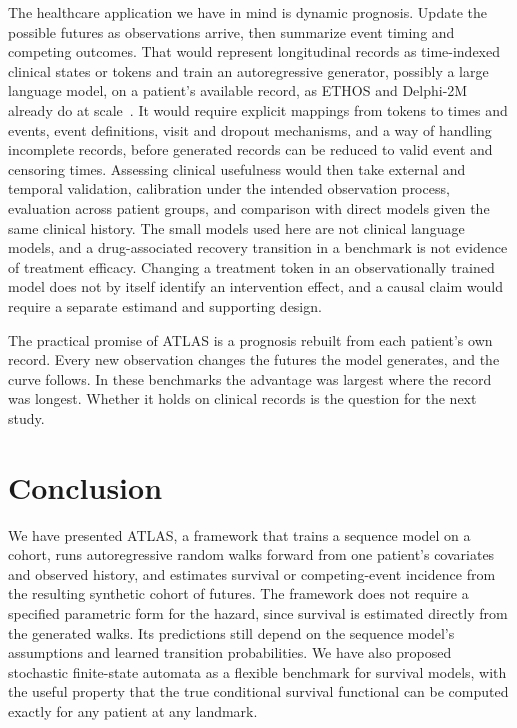The healthcare application we have in mind is dynamic prognosis. Update the possible futures as observations arrive, then summarize event timing and competing outcomes. That would represent longitudinal records as time-indexed clinical states or tokens and train an autoregressive generator, possibly a large language model, on a patient's available record, as ETHOS and Delphi-2M already do at scale~\citep{renc2024,shmatko2025}. It would require explicit mappings from tokens to times and events, event definitions, visit and dropout mechanisms, and a way of handling incomplete records, before generated records can be reduced to valid event and censoring times. Assessing clinical usefulness would then take external and temporal validation, calibration under the intended observation process, evaluation across patient groups, and comparison with direct models given the same clinical history. The small models used here are not clinical language models, and a drug-associated recovery transition in a benchmark is not evidence of treatment efficacy. Changing a treatment token in an observationally trained model does not by itself identify an intervention effect, and a causal claim would require a separate estimand and supporting design.

The practical promise of ATLAS is a prognosis rebuilt from each patient's own record. Every new observation changes the futures the model generates, and the curve follows. In these benchmarks the advantage was largest where the record was longest. Whether it holds on clinical records is the question for the next study.

\section{Conclusion}
We have presented ATLAS, a framework that trains a sequence model on a cohort, runs autoregressive random walks forward from one patient's covariates and observed history, and estimates survival or competing-event incidence from the resulting synthetic cohort of futures. The framework does not require a specified parametric form for the hazard, since survival is estimated directly from the generated walks. Its predictions still depend on the sequence model's assumptions and learned transition probabilities. We have also proposed stochastic finite-state automata as a flexible benchmark for survival models, with the useful property that the true conditional survival functional can be computed exactly for any patient at any landmark.

